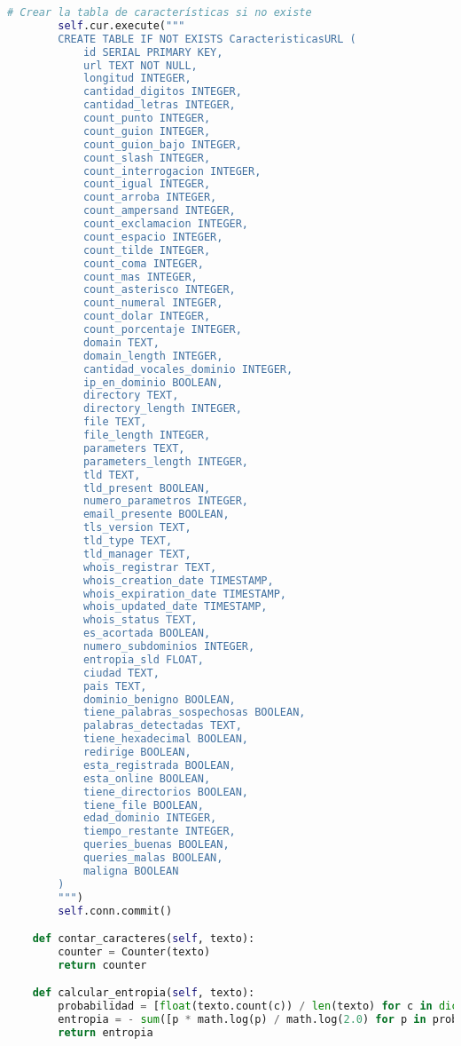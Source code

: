 \documentclass{article}
\begin{document}
\begin{lstlisting}[language=Python, caption=Clase para extraer características de URLs]
        # Crear la tabla de características si no existe
        self.cur.execute("""
        CREATE TABLE IF NOT EXISTS CaracteristicasURL (
            id SERIAL PRIMARY KEY,
            url TEXT NOT NULL,
            longitud INTEGER,
            cantidad_digitos INTEGER,
            cantidad_letras INTEGER,
            count_punto INTEGER,
            count_guion INTEGER,
            count_guion_bajo INTEGER,
            count_slash INTEGER,
            count_interrogacion INTEGER,
            count_igual INTEGER,
            count_arroba INTEGER,
            count_ampersand INTEGER,
            count_exclamacion INTEGER,
            count_espacio INTEGER,
            count_tilde INTEGER,
            count_coma INTEGER,
            count_mas INTEGER,
            count_asterisco INTEGER,
            count_numeral INTEGER,
            count_dolar INTEGER,
            count_porcentaje INTEGER,
            domain TEXT,
            domain_length INTEGER,
            cantidad_vocales_dominio INTEGER,
            ip_en_dominio BOOLEAN,
            directory TEXT,
            directory_length INTEGER,
            file TEXT,
            file_length INTEGER,
            parameters TEXT,
            parameters_length INTEGER,
            tld TEXT,
            tld_present BOOLEAN,
            numero_parametros INTEGER,
            email_presente BOOLEAN,
            tls_version TEXT,
            tld_type TEXT,
            tld_manager TEXT,
            whois_registrar TEXT,
            whois_creation_date TIMESTAMP,
            whois_expiration_date TIMESTAMP,
            whois_updated_date TIMESTAMP,
            whois_status TEXT,
            es_acortada BOOLEAN,
            numero_subdominios INTEGER,
            entropia_sld FLOAT,
            ciudad TEXT,
            pais TEXT,
            dominio_benigno BOOLEAN,
            tiene_palabras_sospechosas BOOLEAN,
            palabras_detectadas TEXT,
            tiene_hexadecimal BOOLEAN,
            redirige BOOLEAN,
            esta_registrada BOOLEAN,
            esta_online BOOLEAN,
            tiene_directorios BOOLEAN,
            tiene_file BOOLEAN,
            edad_dominio INTEGER,
            tiempo_restante INTEGER,
            queries_buenas BOOLEAN,
            queries_malas BOOLEAN,
            maligna BOOLEAN
        )
        """)
        self.conn.commit()

    def contar_caracteres(self, texto):
        counter = Counter(texto)
        return counter

    def calcular_entropia(self, texto):
        probabilidad = [float(texto.count(c)) / len(texto) for c in dict.fromkeys(list(texto))]
        entropia = - sum([p * math.log(p) / math.log(2.0) for p in probabilidad])
        return entropia


\end{lstlisting}
\end{document}
